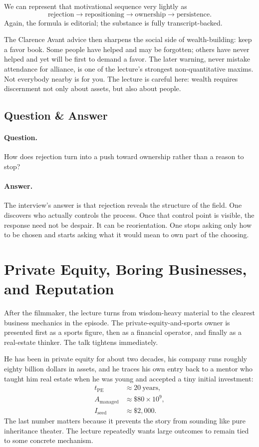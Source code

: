 We can represent that motivational sequence very lightly as
\begin{equation}
\text{rejection} \to \text{repositioning} \to \text{ownership} \to \text{persistence}.
\end{equation}
Again, the formula is editorial; the substance is fully transcript-backed.

The Clarence Avant advice then sharpens the social side of wealth-building: keep a favor book. Some people have helped and may be forgotten; others have never helped and yet will be first to demand a favor. The later warning, never mistake attendance for alliance, is one of the lecture's strongest non-quantitative maxims. Not everybody nearby is for you. The lecture is careful here: wealth requires discernment not only about assets, but also about people.

\subsection{Question \& Answer}

\paragraph{Question.} How does rejection turn into a push toward ownership rather than a reason to stop?

\paragraph{Answer.} The interview's answer is that rejection reveals the structure of the field. One discovers who actually controls the process. Once that control point is visible, the response need not be despair. It can be reorientation. One stops asking only how to be chosen and starts asking what it would mean to own part of the choosing.

\section{Private Equity, Boring Businesses, and Reputation}

After the filmmaker, the lecture turns from wisdom-heavy material to the clearest business mechanics in the episode. The private-equity-and-sports owner is presented first as a sports figure, then as a financial operator, and finally as a real-estate thinker. The talk tightens immediately.

He has been in private equity for about two decades, his company runs roughly eighty billion dollars in assets, and he traces his own entry back to a mentor who taught him real estate when he was young and accepted a tiny initial investment:
\begin{align}
t_{\text{PE}} &\approx 20\ \text{years},\\
A_{\text{managed}} &\approx \$80 \times 10^9,\\
I_{\text{seed}} &\approx \$2{,}000.
\end{align}
The last number matters because it prevents the story from sounding like pure inheritance theater. The lecture repeatedly wants large outcomes to remain tied to some concrete mechanism.

